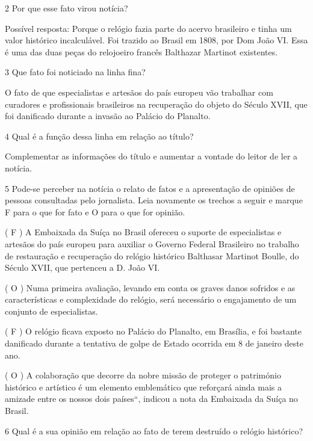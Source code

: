 \begin{itemize}
\begin{itemize}
{\begin{itemize}
\begin{itemize}
\num{2} Por que esse fato virou notícia? 

Possível resposta: Porque o relógio fazia parte do acervo brasileiro e
tinha um valor histórico incalculável. Foi trazido ao Brasil em 1808,
por Dom João VI. Essa é uma das duas peças do relojoeiro francês
Balthazar Martinot existentes.~

\num{3} Que fato foi noticiado na linha fina? 

O fato de que especialistas e artesãos do país europeu vão trabalhar com
curadores e profissionais brasileiros na recuperação do objeto do Século
XVII, que foi danificado durante a invasão ao Palácio do Planalto.

\num{4} Qual é a função dessa linha em relação ao título?


Complementar as informações do título e aumentar a vontade do leitor de
ler a notícia.

\num{5} Pode-se perceber na notícia o relato de fatos e a apresentação
de opiniões de pessoas consultadas pelo jornalista. Leia novamente os
trechos a seguir e marque F para o que for fato e O para o que for
opinião.


( F ) A Embaixada da Suíça no Brasil ofereceu o suporte de especialistas
e artesãos do país europeu para auxiliar o Governo Federal Brasileiro no
trabalho de restauração e recuperação do relógio histórico Balthasar
Martinot Boulle, do Século XVII, que pertenceu a D. João VI.

( O ) Numa primeira avaliação, levando em conta os graves danos sofridos
e as características e complexidade do relógio, será necessário o
engajamento de um conjunto de especialistas.

( F ) O relógio ficava exposto no Palácio do Planalto, em Brasília, e
foi bastante danificado durante a tentativa de golpe de Estado ocorrida
em 8 de janeiro deste ano.

( O ) A colaboração que decorre da nobre missão de proteger o património
histórico e artístico é um elemento emblemático que reforçará ainda mais
a amizade entre os nossos dois países``, indicou a nota da Embaixada da
Suíça no Brasil.

\num{6} Qual é a sua opinião em relação ao fato de terem destruído o
relógio histórico?


\end{itemize}
\end{itemize}}
\end{itemize}
\end{itemize}
